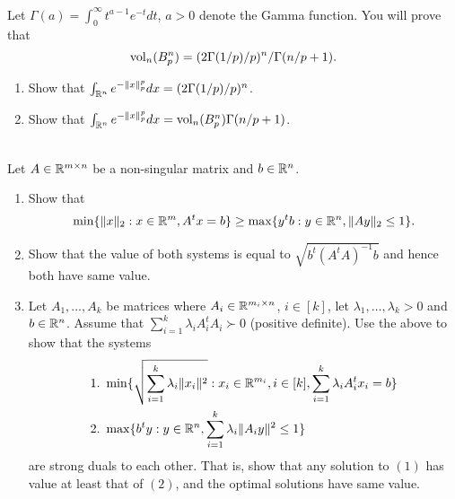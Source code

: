 

\newif\ifsolutions\solutionsfalse



\ifsolutions
\exercisesol{1}
\else
{}
\fi

\begin{exercise}~\\
Let $\Gamma(a) = \int_0^\infty t^{a-1} e^{-t} dt$, $a > 0$ denote the Gamma function.
You will prove that
\[
{\rm vol}_n(B_p^n) = (2\Gamma(1/p)/p)^n/\Gamma(n/p+1).
\]
\begin{enumerate}
\item Show that $\int_{\mathbb{R}^n} e^{-\|x\|_p^p} dx = (2\Gamma(1/p)/p)^n$. \\
\item Show that $\int_{\mathbb{R}^n} e^{-\|x\|_p^p} dx = {\rm vol}_n(B_p^n) \Gamma(n/p+1)$.
\\
\end{enumerate}
\end{exercise}
\solution{
}

\begin{exercise}~\\
Let $A \in \mathbb{R}^{m \times n}$ be a non-singular matrix and $b \in \mathbb{R}^n$. 
\begin{enumerate}
\item Show that 
\[
\min \{{\|x\|_2: x \in \mathbb{R}^m, A^t x = b}\} \geq \max \{{ y^t b: y \in \mathbb{R}^n, \|A
y\|_2 \leq 1}\}.
\]
\item Show that the value of both systems is equal to
$\sqrt{b^t (A^t A)^{-1} b}$ and hence both have same value.
\item Let $A_1,\dots,A_k$ be matrices where $A_i \in \mathbb{R}^{m_i \times n}$, $i \in
[k]$, let $\lambda_1,\dots,\lambda_k > 0$ and $b \in \mathbb{R}^n$. Assume that
$\sum_{i=1}^k \lambda _i A_i^t A_i \succ 0$ (positive definite). Use
the above to show that the systems  
\begin{align*}
&1.~ \min \{{\sqrt{\sum_{i=1}^k \lambda_i \|x_i\|^2}: x_i \in \mathbb{R}^{m_i}, i \in [k],
\sum_{i=1}^k \lambda_i A_i^t x_i = b}\} \\
&2.~ \max \{{ b^t y: y \in \mathbb{R}^n, \sum_{i=1}^k \lambda_i \|A_i y\|^2 \leq 1}\}
\end{align*}
are strong duals to each other. That is, show that  any solution to $(1)$ has
value at least that of $(2)$, and the optimal solutions have same value.
\end{enumerate}
\end{exercise}
\solution{
}

